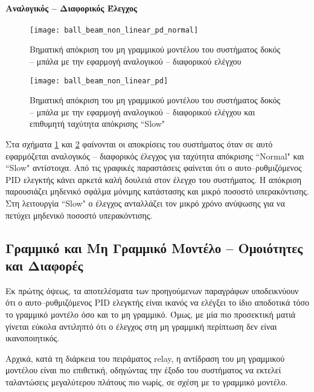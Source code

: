 \paragraph{Αναλογικός -- Διαφορικός Έλεγχος}\hfill

\begin{figure}[H]
  \centering
  \texttt{[image: ball\_beam\_non\_linear\_pd\_normal]}
  \caption{Βηματική απόκριση του μη γραμμικού μοντέλου του συστήματος δοκός -- μπάλα με την εφαρμογή αναλογικού -- διαφορικού ελέγχου}
  \label{fig:ball_beam_non_linear_pd_normal}
\end{figure}

\begin{figure}[h]
  \centering
  \texttt{[image: ball\_beam\_non\_linear\_pd]}
  \caption{Βηματική απόκριση του μη γραμμικού μοντέλου του συστήματος δοκός -- μπάλα με την εφαρμογή αναλογικού -- διαφορικού ελέγχου και επιθυμητή ταχύτητα απόκρισης ``Slow"}
  \label{fig:ball_beam_non_linear_pd}
\end{figure}

Στα σχήματα \ref{fig:ball_beam_non_linear_pd_normal} και \ref{fig:ball_beam_non_linear_pd} φαίνονται οι αποκρίσεις του συστήματος όταν σε αυτό εφαρμόζεται αναλογικός -- διαφορικός έλεγχος για ταχύτητα απόκρισης ``Normal" και ``Slow" αντίστοιχα. Από τις γραφικές παραστάσεις φαίνεται ότι ο αυτο--ρυθμιζόμενος PID ελεγκτής κάνει αρκετά καλή δουλειά στον έλεγχο του συστήματος. Η απόκριση παρουσιάζει μηδενικό σφάλμα μόνιμης κατάστασης και μικρό ποσοστό υπερακόντισης. Στη λειτουργία ``Slow" ο έλεγχος ανταλλάζει τον μικρό χρόνο ανύψωσης για να πετύχει μηδενικό ποσοστό υπερακόντισης.

\subsection{Γραμμικό και Μη Γραμμικό Μοντέλο -- Ομοιότητες και Διαφορές}

Εκ πρώτης όψεως, τα αποτελέσματα των προηγούμενων παραγράφων υποδεικνύουν ότι ο αυτο--ρυθμιζόμενος PID ελεγκτής είναι ικανός να ελέγξει το ίδιο αποδοτικά τόσο το γραμμικό μοντέλο όσο και το μη γραμμικό. Όμως, με μία πιο προσεκτική ματιά γίνεται εύκολα αντιληπτό ότι ο έλεγχος στη μη γραμμική περίπτωση δεν είναι ικανοποιητικός.

Αρχικά, κατά τη διάρκεια του πειράματος relay, η αντίδραση του μη γραμμικού μοντέλου είναι πιο επιθετική, οδηγώντας την έξοδο του συστήματος να εκτελεί ταλαντώσεις μεγαλύτερου πλάτους πιο νωρίς, σε σχέση με το γραμμικό μοντέλο.

